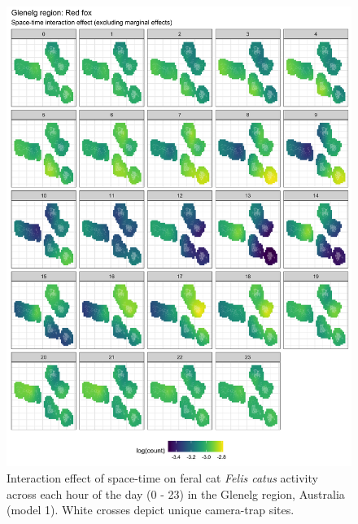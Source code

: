 \documentclass[]{elsarticle} %
\begin{document}
\begin{figure}

{\centering \includegraphics[width=1\linewidth]{../figs/spte_diff_avg_g_fox} 

}

\caption{Interaction effect of space-time on feral cat \textit{Felis catus} activity across each hour of the day (0 - 23) in the Glenelg region, Australia (model 1). White crosses depict unique camera-trap sites. }\label{fig:diel-st-int-g-fox}
\end{figure}

\newpage
\end{document}

